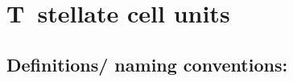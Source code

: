 
% 

% 





% 
% 




%


\section{T~stellate cell units}


\subsection{Definitions/ naming conventions:}
\label{sec-1_1}


